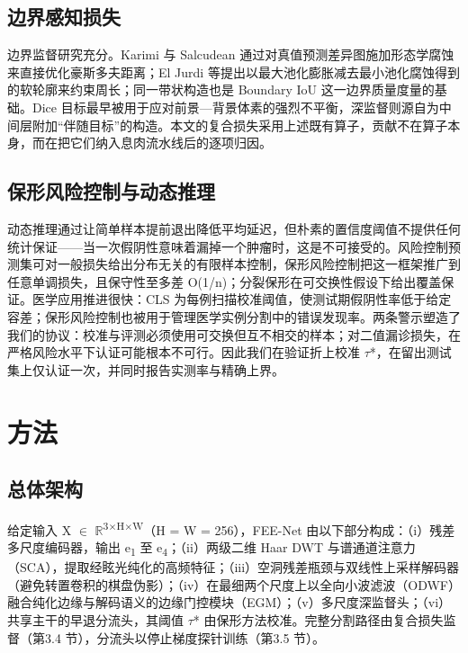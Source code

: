 \documentclass[conference]{IEEEtran}
\begin{document}
\subsection{边界感知损失}

边界监督研究充分。Karimi 与 Salcudean 通过对真值预测差异图施加形态学腐蚀来直接优化豪斯多夫距离\cite{karimi2019hd}；El Jurdi 等提出以最大池化膨胀减去最小池化腐蚀得到的软轮廓来约束周长\cite{eljurdi2021perimeter}；同一带状构造也是 Boundary IoU 这一边界质量度量的基础\cite{cheng2021boundaryiou}。Dice 目标最早被用于应对前景—背景体素的强烈不平衡\cite{milletari2016vnet}，深监督则源自为中间层附加“伴随目标”的构造\cite{lee2015dsn}。本文的复合损失采用上述既有算子，贡献不在算子本身，而在把它们纳入息肉流水线后的逐项归因。

\subsection{保形风险控制与动态推理}

动态推理通过让简单样本提前退出降低平均延迟，但朴素的置信度阈值不提供任何统计保证——当一次假阴性意味着漏掉一个肿瘤时，这是不可接受的。风险控制预测集可对一般损失给出分布无关的有限样本控制\cite{bates2021rcps}，保形风险控制把这一框架推广到任意单调损失，且保守性至多差 O(1/n)\cite{angelopoulos2022crc}；分裂保形在可交换性假设下给出覆盖保证\cite{angelopoulos2021gentle}。医学应用推进很快：CLS 为每例扫描校准阈值，使测试期假阴性率低于给定容差\cite{tan2025cls}；保形风险控制也被用于管理医学实例分割中的错误发现率\cite{dai2025crcfdr}。两条警示塑造了我们的协议：校准与评测必须使用可交换但互不相交的样本；对二值漏诊损失，在严格风险水平下认证可能根本不可行\cite{zheng2026crc}。因此我们在验证折上校准 $\tau$*，在留出测试集上仅认证一次，并同时报告实测率与精确上界。

\section{方法}

\subsection{总体架构}

给定输入 X $\in$ $\mathbb{R}$\textsuperscript{3$\times$H$\times$W}（H = W = 256），FEE-Net 由以下部分构成：（i）残差多尺度编码器，输出 e\textsubscript{1} 至 e\textsubscript{4}；（ii）两级二维 Haar DWT 与谱通道注意力（SCA），提取经眩光纯化的高频特征；（iii）空洞残差瓶颈与双线性上采样解码器（避免转置卷积的棋盘伪影\cite{odena2016checker}）；（iv）在最细两个尺度上以全向小波滤波（ODWF）融合纯化边缘与解码语义的边缘门控模块（EGM）；（v）多尺度深监督头；（vi）共享主干的早退分流头，其阈值 $\tau$* 由保形方法校准。完整分割路径由复合损失监督（第3.4 节），分流头以停止梯度探针训练（第3.5 节）。
\end{document}
